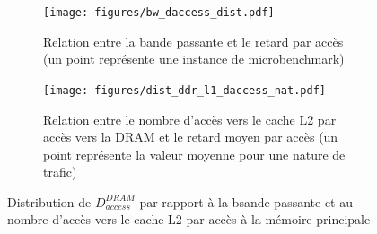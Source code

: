 \begin{figure}[h!]
	\centering
	\begin{subfigure}[t]{0.48\linewidth}
	\texttt{[image: figures/bw\_daccess\_dist.pdf]}
		\caption{\label{fig:dist_bw_daccess}Relation entre la bande passante et le retard par accès (un point représente une instance de microbenchmark)}
	\end{subfigure}
	\begin{subfigure}[t]{0.48\linewidth}
		\texttt{[image: figures/dist\_ddr\_l1\_daccess\_nat.pdf]}
		\caption{\label{fig:dist_access_daccess}Relation entre le nombre d'accès vers le cache L2 par accès vers la DRAM et le retard moyen par accès (un point représente la valeur moyenne pour une nature de trafic)}
	\end{subfigure}
	\caption{\label{fig:daccess}Distribution de $D_{access}^{DRAM}$ par rapport à la bsande passante et au nombre d'accès vers le cache L2 par accès à la mémoire principale}
\end{figure}




